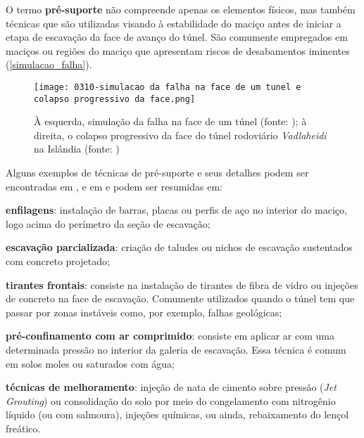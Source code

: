 O termo \textbf{pré-suporte} não compreende apenas os elementos físicos, mas também técnicas que são utilizadas visando à estabilidade do maciço antes de iniciar a etapa de escavação da face de avanço do túnel. São comumente empregados em maciços ou regiões do maciço que apresentam riscos de desabamentos iminentes (\autoref{simulacao_falha}).

\begin{figure}[H]
	\begin{center}
		\texttt{[image: 0310-simulacao da falha na face de um tunel e colapso progressivo da face.png]}
	\end{center}
	\caption{\label{simulacao_falha}À esquerda, simulação da falha na face de um túnel (fonte: ); à direita, o colapso progressivo da face do túnel rodoviário \textit{Vadlaheidi} na Islândia (fonte: )}
\end{figure}

Alguns exemplos de técnicas de pré-suporte e seus detalhes podem ser encontradas em ,  e em  e podem ser resumidas em:

\begin{alineas}
	
	\item \textbf{enfilagens}: instalação de barras, placas ou perfis de aço no interior do maciço, logo acima do perímetro da seção de escavação;
	
	\item \textbf{escavação parcializada}: criação de taludes ou nichos de escavação sustentados com concreto projetado;
	
	\item \textbf{tirantes frontais}: consiste na instalação de tirantes de fibra de vidro ou injeções de concreto na face de escavação. Comumente utilizados quando o túnel tem que passar por zonas instáveis como, por exemplo, falhas geológicas;
	
	\item \textbf{pré-confinamento com ar comprimido}: consiste em aplicar ar com uma determinada pressão no interior da galeria de escavação. Essa técnica é comum em solos moles ou saturados com água;

	\item \textbf{técnicas de melhoramento}: injeção de nata de cimento sobre pressão (\textit{Jet Grouting}) ou consolidação do solo por meio do congelamento com nitrogênio líquido (ou com salmoura), injeções químicas, ou ainda, rebaixamento do lençol freático.

\end{alineas}

